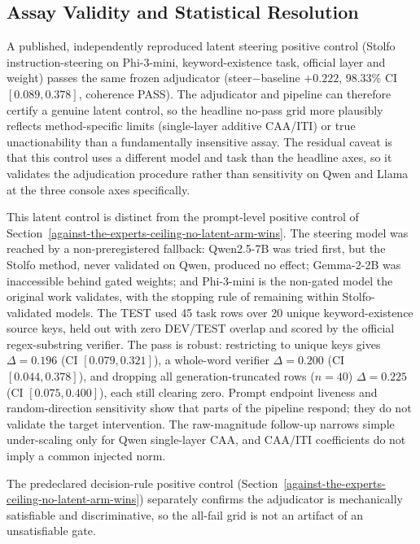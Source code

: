 \documentclass[manuscript,review,anonymous]{acmart}
\begin{document}
\subsection{Assay Validity and Statistical Resolution}\label{assay-validity-and-statistical-resolution}

A published, independently reproduced latent steering positive control (Stolfo instruction-steering on Phi-3-mini, keyword-existence task, official layer and weight) passes the same frozen adjudicator (steer\(-\)baseline \(+0.222\), 98.33\% CI \([0.089,0.378]\), coherence PASS). The adjudicator and pipeline can therefore certify a genuine latent control, so the headline no-pass grid more plausibly reflects method-specific limits (single-layer additive CAA/ITI) or true unactionability than a fundamentally insensitive assay. The residual caveat is that this control uses a different model and task than the headline axes, so it validates the adjudication procedure rather than sensitivity on Qwen and Llama at the three console axes specifically. {}%
{}%

This latent control is distinct from the prompt-level positive control of Section~\ref{against-the-experts-ceiling-no-latent-arm-wins}. The steering model was reached by a non-preregistered fallback: Qwen2.5-7B was tried first, but the Stolfo method, never validated on Qwen, produced no effect; Gemma-2-2B was inaccessible behind gated weights; and Phi-3-mini is the non-gated model the original work validates, with the stopping rule of remaining within Stolfo-validated models. The TEST used 45 task rows over 20 unique keyword-existence source keys, held out with zero DEV/TEST overlap and scored by the official regex-substring verifier. The pass is robust: restricting to unique keys gives \(\Delta=0.196\) (CI \([0.079,0.321]\)), a whole-word verifier \(\Delta=0.200\) (CI \([0.044,0.378]\)), and dropping all generation-truncated rows (\(n=40\)) \(\Delta=0.225\) (CI \([0.075,0.400]\)), each still clearing zero.
Prompt endpoint liveness and random-direction sensitivity show that parts of the pipeline respond; they do not validate the target intervention. The raw-magnitude follow-up narrows simple under-scaling only for Qwen single-layer CAA, and CAA/ITI coefficients do not imply a common injected norm. {}%
{}%
{}%

The predeclared decision-rule positive control (Section~\ref{against-the-experts-ceiling-no-latent-arm-wins}) separately confirms the adjudicator is mechanically satisfiable and discriminative, so the all-fail grid is not an artifact of an unsatisfiable gate. {}%
\end{document}
